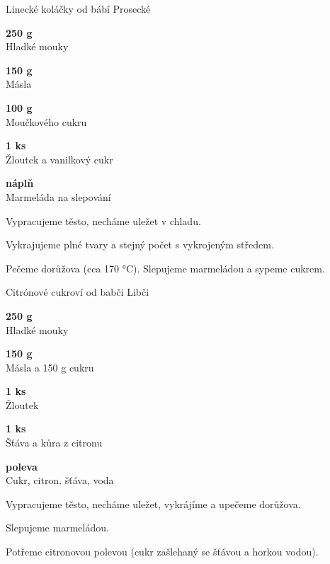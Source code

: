 \documentclass[11pt,a4paper]{article}
\begin{document}
\begin{recipe}[Goldenrod]{Linecké koláčky od bábí Prosecké}
    \begin{ingredients}
        \item \parbox[t]{\linewidth}{\raggedright \weight \textbf{250 g}\\ Hladké mouky}
        \item \parbox[t]{\linewidth}{\raggedright \weight \textbf{150 g}\\ Másla}
        \item \parbox[t]{\linewidth}{\raggedright \weight \textbf{100 g}\\ Moučkového cukru}
        \item \parbox[t]{\linewidth}{\raggedright \piece \textbf{1 ks}\\ Žloutek a vanilkový cukr}
        \item \parbox[t]{\linewidth}{\raggedright \indefinite \textbf{náplň}\\ Marmeláda na slepování}
    \end{ingredients}
    \begin{steps}
        \item Vypracujeme těsto, necháme uležet v chladu.
        \item Vykrajujeme plné tvary a stejný počet s vykrojeným středem.
        \item Pečeme dorůžova (cca 170 °C). Slepujeme marmeládou a sypeme cukrem.
    \end{steps}
\end{recipe}

\begin{recipe}[Fuchsia]{Citrónové cukroví od babči Libči}
    \begin{ingredients}
        \item \parbox[t]{\linewidth}{\raggedright \weight \textbf{250 g}\\ Hladké mouky}
        \item \parbox[t]{\linewidth}{\raggedright \weight \textbf{150 g}\\ Másla a 150 g cukru}
        \item \parbox[t]{\linewidth}{\raggedright \piece \textbf{1 ks}\\ Žloutek}
        \item \parbox[t]{\linewidth}{\raggedright \liquid \textbf{1 ks}\\ Šťáva a kůra z citronu}
        \item \parbox[t]{\linewidth}{\raggedright \indefinite \textbf{poleva}\\ Cukr, citron. šťáva, voda}
    \end{ingredients}
    \begin{steps}
        \item Vypracujeme těsto, necháme uležet, vykrájíme a upečeme dorůžova.
        \item Slepujeme marmeládou.
        \item Potřeme citronovou polevou (cukr zašlehaný se šťávou a horkou vodou).
    \end{steps}
\end{recipe}
\end{document}
